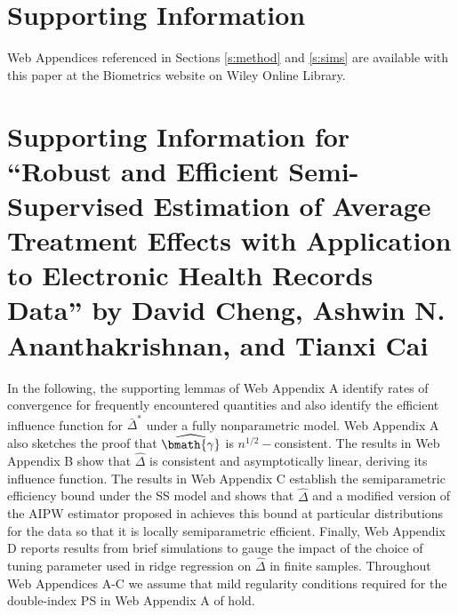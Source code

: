 \documentclass[useAMS,referee,usenatbib]{biom}
\def\bgamhat{\widehat{\bmath{\gamma}}}
\def\Delthat{\widehat{\Delta}}
\def\Deltabarstr{\bar{\Delta}^*}
\begin{document}
 


\section*{Supporting Information}

Web Appendices referenced in Sections \ref{s:method} and \ref{s:sims} are available with this paper at the 
Biometrics website on Wiley Online Library.\vspace*{-8pt}

\label{lastpage}

\processdelayedfloats

\newpage

\section*{Supporting Information for ``Robust and Efficient Semi-Supervised Estimation of Average Treatment Effects with Application to Electronic Health Records Data'' by David Cheng, Ashwin N. Ananthakrishnan, and Tianxi Cai}

\newpage

In the following, the supporting lemmas of Web Appendix A identify rates of convergence for frequently encountered quantities and also identify the efficient influence function for $\Deltabarstr$ under a fully nonparametric model.  Web Appendix A also sketches the proof that $\bgamhat$ is $n^{1/2}-$consistent. The results in Web Appendix B show that $\Delthat$ is consistent and asymptotically linear, deriving its influence function. The results in Web Appendix C establish the semiparametric efficiency bound under the SS model and shows that $\Delthat$ and a modified version of the AIPW estimator proposed in \cite{davidian2005semiparametric} achieves this bound at particular distributions for the data so that it is locally semiparametric efficient. Finally, Web Appendix D reports results 
from brief simulations to gauge the impact of the choice of tuning parameter used in ridge regression on $\Delthat$ in finite samples. Throughout Web Appendices A-C we assume that mild regularity conditions required for the double-index PS in Web Appendix A of \cite{cheng2017estimating} hold.
\end{document}
